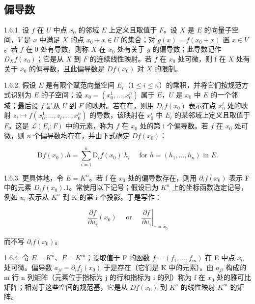 \subsection{偏导数}

1.6.1. 设 \(f\) 在 \(U\) 中点 \(x_0\) 的邻域 \(E\) 上定义且取值于 \(F\)。设 \(X\) 是 \(E\) 的向量子空间，\(V\) 是 \(x\) 中满足 \(X\) 的点 \(x_0 + x \in U\) 的集合；对 \(g(x) = f(x_0 + x)\) 置 \(x \in V\)。若 \(f\) 在 0 处有导数，则称 \(X\) 在 \(x_0\) 处有关于 \(g\) 的偏导数；此导数记作 \(D_X f(x_0)\)；它是从 \(X\) 到 \(F\) 的连续线性映射。若 \(f\) 在 \(x_0\) 处可微，则 f 在 \(X\) 处有关于 \(x_0\) 的偏导数，且此偏导数是 \(Df(x_0)\) 对 \(X\) 的限制。

1.6.2. 假设 \(E\) 是有限个赋范向量空间 \(E_{i}\)（\(1 \leqslant i \leqslant n\)）的乘积，并将它们按规范方式识别为 \(E\) 的子空间；设 \(x_{0} = (x_{0}^{1}, \ldots, x_{0}^{n})\) 属于 \(E\)，\(U\) 是 \(x_{0}\) 中 \(E\) 的一个邻域；最后设 \(f\) 是从 \(U\) 到 \(F\) 的映射。若存在，则用 \(D_{i}f(x_{0})\) 表示在点 \(x_{0}^{i}\) 处的映射 \(z_{i} \mapsto f(x_{0}^{1}, \ldots, z_{i}, \ldots, x_{0}^{n})\) 的导数，该映射在 \(x_{0}^{i}\) 中 \(E_{i}\) 的某邻域上定义且取值于 \(F\)。这是 \(\mathcal{L}(E_{i}; F)\) 中的元素，称为 \(f\) 在 \(x_{0}\) 处的第 i 个偏导数。若 \(f\) 在 \(x_{0}\) 处可微，则 \(n\) 个偏导数均存在，并由下式确定 \(Df(x_{0})\)：

\[
\mathrm{D} f (x _ {0}). h = \sum_ {i = 1} ^ {n} \mathrm{D} _ {i} f (x _ {0}). h _ {i} \quad \text { for } h = (h _ {1}, \dots , h _ {n}) \text { in } E.
\]

1.6.3. 更具体地，令 \(E = K^{n}\)。若 f 在 \(x_{0}\) 处的偏导数存在，则用 \(\partial_{i}f(x_{0})\) 表示 F 中的元素 \(D_{i}f(x_{0}).1\)。常使用以下记号；假设已为 \(K^{n}\) 上的坐标函数选定记号，例如 \(u_{i}\) 表示从 \(K^{n}\) 到 K 的第 i 个投影。于是写作：

\[
\frac {\partial f}{\partial u _ {i}} \left(x _ {0}\right) \quad \text { or } \quad \left. \frac {\partial f}{\partial u _ {i}} \right| _ {x = x _ {0}}
\]

而不写 \(\partial_{i}f(x_{0})\)。

1.6.4. 令 \(E = K^{n}\)、\(F = K^{m}\)；设取值于 F 的函数 \(f = (f_{1}, \ldots, f_{m})\) 在 E 中点 \(x_{0}\) 处可微。偏导数 \(a_{ji} = \partial_{i} f_{j}(x_{0})\) 于是存在（它们是 K 中的元素）。由 \(a_{ji}\) 构成的 m 行 n 列矩阵（元素位于指标为 j 的行和指标为 i 的列）称为 f 在 \(x_{0}\) 处的雅可比矩阵；相对于这些空间的规范基，它是从 \(Df(x_{0})\) 到 \(K^{n}\) 的线性映射 \(K^{m}\) 的矩阵。

